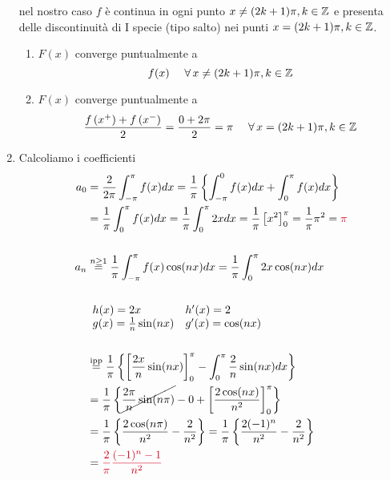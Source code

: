 \begin{enumerate}
nel nostro caso $f$ è continua in ogni punto $x\neq (2k + 1) \pi, k\in \mathbb{Z} $ e presenta delle discontinuità di I specie (tipo salto) nei punti $x = (2k + 1) \pi, k\in \mathbb{Z} $.
\begin{enumerate}
\item $F(x)$ converge puntualmente a
\begin{equation*}
f(x) \ \ \ \ \forall x\neq (2k + 1) \pi, k\in \ZZ
\end{equation*}
\item $F(x)$ converge puntualmente a
\begin{equation*}
\frac{f\left(x^{+}\right) + f\left(x^{-}\right)}{2} = \frac{0 + 2\pi}{2} = \pi \ \ \ \ \forall x = (2k + 1) \pi, k\in \ZZ
\end{equation*}
\end{enumerate}
\item Calcoliamo i coefficienti
\begin{align*}
a_{0} & = \frac{2}{2\pi}\int^{\pi}_{- \pi} f(x) dx = \frac{1}{\pi}\left\{\int^{0}_{- \pi} f(x) dx + \int^{\pi}_{0} f(x) dx\right\}\\
 & = \frac{1}{\pi}\int^{\pi}_{0} f(x) dx = \frac{1}{\pi}\int^{\pi}_{0} 2xdx = \frac{1}{\pi}\left[ x^{2}\right]^{\pi}_{0} = \frac{1}{\pi} \pi^{2} = \textcolor[rgb]{0.82, 0.01, 0.11}{\pi}\\
 & \\
a_{n} & \overset{n \geq 1}{=}\frac{1}{\pi}\int^{\pi}_{- \pi} f(x)\cos(nx) dx = \frac{1}{\pi}\int^{\pi}_{0} 2x\cos(nx) dx\\
 & \\
 &
\begin{array}{l l}
h(x) = 2x & h'(x) = 2\\
g(x) = \frac{1}{n}\sin(nx) & g'(x) = \cos(nx)
\end{array}\\
 & \\
 & \overset{\text{ipp}}{=}\frac{1}{\pi}\left\{\left[\frac{2x}{n}\sin(nx)\right]^{\pi}_{0} - \int^{\pi}_{0}\frac{2}{n}\sin(nx) dx\right\}\\
 & = \frac{1}{\pi}\left\{\cancel{\frac{2\pi}{n}\sin(n\pi)} - 0 + \left[\frac{2\cos(nx)}{n^{2}}\right]^{\pi}_{0}\right\}\\
 & = \frac{1}{\pi}\left\{\frac{2\cos(n\pi)}{n^{2}} - \frac{2}{n^{2}}\right\} = \frac{1}{\pi}\left\{\frac{2(- 1)^{n}}{n^{2}} - \frac{2}{n^{2}}\right\}\\
 & = \textcolor[rgb]{0.82, 0.01, 0.11}{\frac{2}{\pi}}\textcolor[rgb]{0.82, 0.01, 0.11}{\frac{(- 1)^{n} - 1}{n^{2}}}\\

\end{align*}
\end{enumerate}
